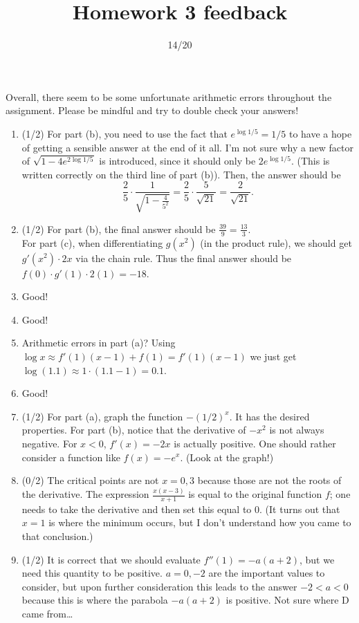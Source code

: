 \documentclass{article}
\title{Homework 3 feedback}
\author{}
\date{14/20}
\begin{document}
\maketitle
Overall, there seem to be some unfortunate arithmetic errors throughout the assignment. Please be mindful and try to double check your answers!
\begin{enumerate}
	\item (1/2) For part (b), you need to use the fact that $e^{\log 1/5} = 1/5$ to have a hope of getting a sensible answer at the end of it all. I'm not sure why a new factor of $\sqrt{1 - 4e^{2 \log 1/5}}$ is introduced, since it should only be $2e^{\log 1/5}$. (This is written correctly on the third line of part (b)). Then, the answer should be 
		\[
			\frac{2}{5} \cdot \frac{1}{\sqrt{1 - \frac{4}{5^{2}}}} = \frac{2}{5} \cdot \frac{5}{\sqrt{21}} = \frac{2}{\sqrt{21}}.
		\]
	\item (1/2) For part (b), the final answer should be $\frac{39}{9} = \frac{13}{3}$.\\
		For part (c), when differentiating $g(x^{2})$ (in the product rule), we should get $g'(x^{2}) \cdot 2x$ via the chain rule. Thus the final answer should be $f(0) \cdot g'(1) \cdot 2(1) = -18$.
	\item Good!
	\item Good!
	\item Arithmetic errors in part (a)? Using $\log x \approx f'(1) (x-1) + f(1) = f'(1) (x-1)$ we just get $\log(1.1) \approx 1 \cdot (1.1 - 1) = 0.1$.
	\item Good!
	\item (1/2) For part (a), graph the function $-(1/2)^{x}$. It has the desired properties. For part (b), notice that the derivative of $-x^{2}$ is not always negative. For $x < 0$, $f'(x) = -2x$ is actually positive. One should rather consider a function like $f(x) = - e^{x}$. (Look at the graph!)
	\item (0/2) The critical points are not $x = 0, 3$ because those are not the roots of the derivative. The expression $\frac{x(x-3)}{x+1}$ is equal to the original function $f$; one needs to take the derivative and then set this equal to 0. (It turns out that $x=1$ is where the minimum occurs, but I don't understand how you came to that conclusion.)
	\item (1/2) It is correct that we should evaluate $f''(1) = -a(a+2)$, but we need this quantity to be positive. $a = 0, -2$ are the important values to consider, but upon further consideration this leads to the answer $-2 < a < 0$ because this is where the parabola $-a (a+2)$ is positive. Not sure where D came from\ldots
\end{enumerate}
\end{document}
